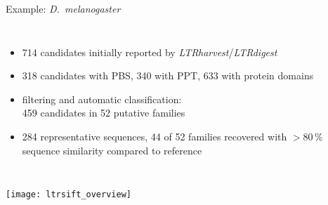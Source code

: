 \documentclass[final]{beamer}
\begin{document}
\begin{frame}[fragile]
\begin{columns}[t]
\begin{column}{.45\linewidth}
\begin{columns}[t]
\begin{column}{.51\linewidth}
\begin{block}{Example: \emph{D.~melanogaster}}
\begin{columns}
                    \begin{itemize}
                      \item 714 candidates initially reported by
                            \emph{LTRharvest}/\emph{LTRdigest}
                      \item 318 candidates with PBS, 340 with PPT, 633 with protein domains
                      \item filtering and automatic classification:\\459
                            candidates in 52 putative families
                      \item 284 representative sequences, 44 of 52 families
                            recovered with $>80\,\%$ sequence similarity
                            compared to reference
                    \end{itemize}
                    \vspace{.60cm}
                \end{columns}
            \end{block}
          \end{column}
        \end{columns}

      \end{column}
    \end{columns}

\vspace{.6cm}

\begin{columns}[t]
      \vspace{.5cm}
      \begin{center}
        \texttt{[image: ltrsift\_overview]}
      \end{center}



\end{columns}
\end{frame}
\end{document}
